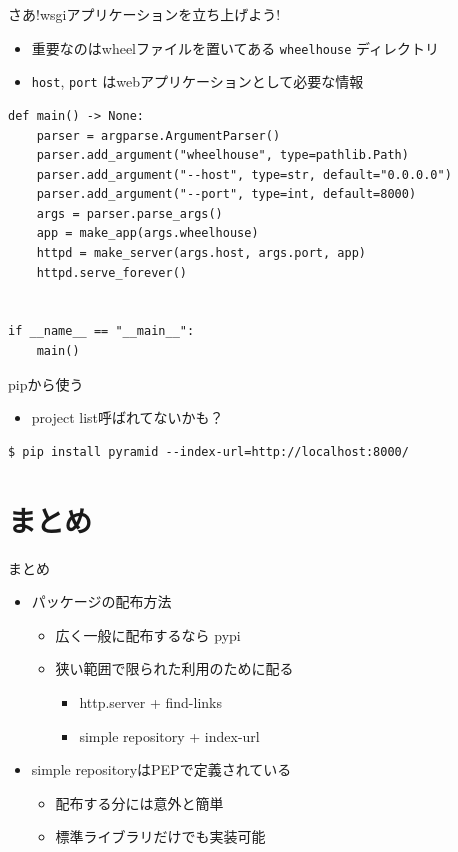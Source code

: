 \documentclass[presentation]{beamer}
\begin{document}
\begin{frame}[label={sec:org1e0f478},fragile]{さあ!wsgiアプリケーションを立ち上げよう!}
 \begin{itemize}
\item 重要なのはwheelファイルを置いてある \texttt{wheelhouse} ディレクトリ
\item \texttt{host}, \texttt{port} はwebアプリケーションとして必要な情報
\end{itemize}

\begin{verbatim}
def main() -> None:
    parser = argparse.ArgumentParser()
    parser.add_argument("wheelhouse", type=pathlib.Path)
    parser.add_argument("--host", type=str, default="0.0.0.0")
    parser.add_argument("--port", type=int, default=8000)
    args = parser.parse_args()
    app = make_app(args.wheelhouse)
    httpd = make_server(args.host, args.port, app)
    httpd.serve_forever()


if __name__ == "__main__":
    main()
\end{verbatim}
\end{frame}

\begin{frame}[label={sec:orgc62eb9d},fragile]{pipから使う}
 \begin{itemize}
\item project list呼ばれてないかも？
\end{itemize}


\begin{verbatim}
$ pip install pyramid --index-url=http://localhost:8000/
\end{verbatim}
\end{frame}
\section{まとめ}
\label{sec:org08d645f}
\begin{frame}[label={sec:org4f183bb}]{まとめ}
\begin{itemize}
\item パッケージの配布方法
\begin{itemize}
\item 広く一般に配布するなら pypi
\item 狭い範囲で限られた利用のために配る
\begin{itemize}
\item http.server + find-links
\item simple repository + index-url
\end{itemize}
\end{itemize}
\item simple repositoryはPEPで定義されている
\begin{itemize}
\item 配布する分には意外と簡単
\item 標準ライブラリだけでも実装可能
\end{itemize}
\end{itemize}
\end{frame}
\end{document}
